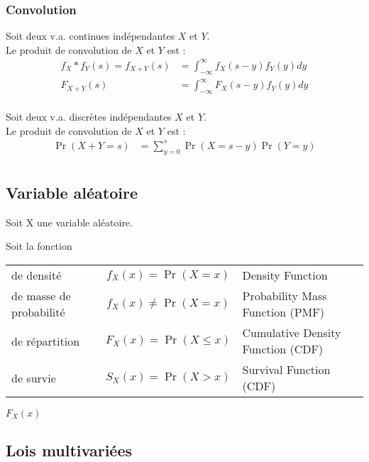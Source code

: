 \documentclass[10pt, french]{article}
\begin{document}
\begin{multicols*}{2}
\subsubsection*{Convolution}
\begin{definitionNOHFILLprop}
Soit deux v.a. continues indépendantes $X$ et $Y$.\\
Le produit de convolution de $X$ et $Y$ est :
\begin{align*}
	f_{X} \ast f_{Y}(s)
	=	f_{X + Y}(s)
	&=	\int_{-\infty}^{\infty}f_{X}(s - y)f_{Y}(y)dy	\\
	F_{X + Y}(s)
	&=	\int_{-\infty}^{\infty}F_{X}(s - y)f_{Y}(y)dy	\\
\end{align*}

\tcbline

Soit deux v.a. discrètes indépendantes $X$ et $Y$.\\
Le produit de convolution de $X$ et $Y$ est :
\begin{align*}
	\Pr(X + Y = s)
	&=	\sum_{y = 0}^{s}\Pr(X = s - y)\Pr(Y = y)	\\
\end{align*}

\end{definitionNOHFILLprop}

\subsection*{Variable aléatoire}

Soit X une variable aléatoire.

Soit la fonction

\begin{tabular}{| l | c | l |}
\hline
	de densité	&	$f_{X}(x) = \Pr(X = x)$	&	 Density Function	\\
	de masse de probabilité	&	$f_{X}(x) \neq \Pr(X = x)$	&	Probability Mass Function (PMF)	\\
	de répartition	&	$F_{X}(x) = \Pr(X \le x)$	&	Cumulative Density Function (CDF)\\
	de survie	&	$S_{X}(x) = \Pr(X > x)$	&	Survival Function (CDF)\\\hline	
\end{tabular}
$F_{X}(x)$

\subsection*{Lois multivariées}
	

\end{multicols*}
\end{document}
